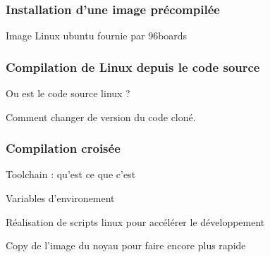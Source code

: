 \subsubsection{Installation d'une image précompilée}

Image Linux ubuntu fournie par 96boards

\subsubsection{Compilation de Linux depuis le code source}

Ou est le code source linux ?

Comment changer de version du code cloné. 

\subsubsection{Compilation croisée}

Toolchain : qu'est ce que c'est

Variables d'environement

Réalisation de scripts linux pour accélérer le développement

Copy de l'image du noyau pour faire encore plus rapide

